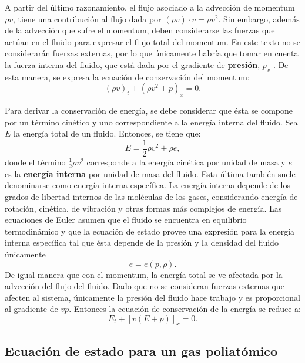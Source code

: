 A partir del último razonamiento, el flujo asociado a la advección de momentum $\rho v$, tiene una contribución al flujo dada por $(\rho v) \cdot v = \rho v^2$. Sin embargo, además de la advección que sufre el momentum, deben considerarse las fuerzas que actúan en el fluido para expresar el flujo total del momentum. En este texto no se considerarán fuerzas externas, por lo que únicamente habría que tomar en cuenta la fuerza interna del fluido, que está dada por el gradiente de \textbf{presión}, $p_x$ \cite{LeVeque}. De esta manera, se expresa la ecuación de conservación del momentum:
\begin{equation}
	(\rho v)_t + (\rho v^{2} + p)_{x} = 0.
	\label{eq:momentum-euler}
\end{equation}

Para derivar la conservación de energía, se debe considerar que ésta se compone por un término cinético y uno correspondiente a la energía interna del fluido. Sea $E$ la energía total de un fluido. Entonces, se tiene que:
\begin{equation}
	E = \frac{1}{2}\rho v^{2} + \rho e,
	\label{eq:energia-euler}
\end{equation}
donde el término $\frac{1}{2}\rho v^{2}$ corresponde a la energía cinética por unidad de masa y $e$ es la \textbf{energía interna} por unidad de masa del fluido. Esta última también suele denominarse como energía interna específica. La energía interna depende de los grados de libertad internos de las moléculas de los gases, considerando energía de rotación, cinética, de vibración y otras formas más complejos de energía. Las ecuaciones de Euler asumen que el fluido se encuentra en equilibrio termodinámico y que la ecuación de estado provee una expresión para la energía interna específica tal que ésta depende de la presión y la densidad del fluido únicamente
\begin{equation}
	e = e(p, \rho).
\end{equation}
De igual manera que con el momentum, la energía total se ve afectada por la advección del flujo del fluido. Dado que no se consideran fuerzas externas que afecten al sistema, únicamente la presión del fluido hace trabajo y es proporcional al gradiente de $vp$. Entonces la ecuación de conservación de la energía se reduce a:
\begin{equation}
	E_{t} + [v(E + p)]_{x} = 0.
	\label{eq:energia-euler}
\end{equation}

\subsection{Ecuación de estado para un gas poliatómico}
